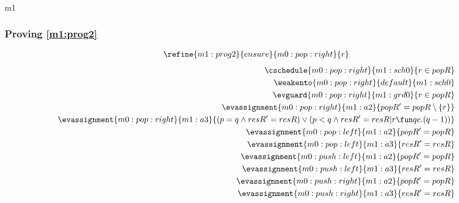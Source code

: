 \documentclass[12pt]{amsart}
\begin{document}
\begin{machine}{m1}
\subsubsection{Proving \ref{m1:prog2}}
\begin{align*}
\refine{m1:prog2}{ensure}{m0:pop:right}{ \index{r}{r} }
\end{align*}
\begin{align*}
\cschedule{m0:pop:right}{m1:sch0}{ r \in popR }
\\ \weakento{m0:pop:right}{default}{m1:sch0}
\\ \evguard{m0:pop:right}{m1:grd0}{ r \in popR }
\\ \evassignment{m0:pop:right}{m1:a2}{ popR' = popR \setminus \{ r \} }
\\ \evassignment{m0:pop:right}{m1:a3}{ (p = q \land resR' = resR) 
	\lor (p < q \land resR' = resR | r \fun qe.(q-1) ) }
\\ \evassignment{m0:pop:left}{m1:a2}
	{ popR' = popR }
\\ \evassignment{m0:pop:left}{m1:a3}
	{ resR' = resR }
\\ \evassignment{m0:push:left}{m1:a2}{ popR' = popR }
\\ \evassignment{m0:push:left}{m1:a3}{ resR' = resR }
\\ \evassignment{m0:push:right}{m1:a2}{ popR' = popR }
\\ \evassignment{m0:push:right}{m1:a3}{ resR' = resR }
\end{align*}



\end{machine}
\end{document}
